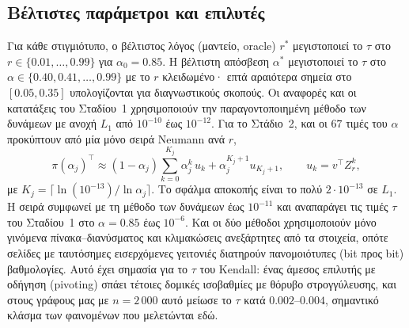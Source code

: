 \documentclass[11pt,a4paper]{article}
\theoremstyle{definition}
\theoremstyle{remark}
\begin{document}
\subsection{Βέλτιστες παράμετροι και επιλυτές}
Για κάθε στιγμιότυπο, ο βέλτιστος λόγος (μαντείο, oracle) $r^*$ μεγιστοποιεί το $\tau$ στο
$r\in\{0.01,\dots,0.99\}$ για $\alpha_0=0.85$. Η βέλτιστη απόσβεση $\alpha^*$ μεγιστοποιεί το $\tau$
στο $\alpha\in\{0.40,0.41,\dots,0.99\}$ με το $r$ κλειδωμένο· επτά αραιότερα σημεία στο $[0.05,0.35]$
υπολογίζονται για διαγνωστικούς σκοπούς. Οι αναφορές και οι κατατάξεις του Σταδίου~1 χρησιμοποιούν την
παραγοντοποιημένη μέθοδο των δυνάμεων με ανοχή $L_1$ από $10^{-10}$ έως $10^{-12}$. Για το Στάδιο~2,
και οι $67$ τιμές του $\alpha$ προκύπτουν από μία μόνο σειρά Neumann ανά $r$,
\[
\pi(\alpha_j)^\top\approx(1-\alpha_j)\sum_{k=0}^{K_j}\alpha_j^k\,u_k+\alpha_j^{K_j+1}u_{K_j+1},
\qquad u_k=v^\top Z_r^k,
\]
με $K_j=\lceil\ln(10^{-13})/\ln\alpha_j\rceil$. Το σφάλμα αποκοπής είναι το πολύ $2\cdot10^{-13}$ σε
$L_1$. Η σειρά συμφωνεί με τη μέθοδο των δυνάμεων έως $10^{-11}$ και αναπαράγει τις τιμές $\tau$ του
Σταδίου~1 στο $\alpha=0.85$ έως $10^{-6}$. Και οι δύο μέθοδοι χρησιμοποιούν μόνο γινόμενα
πίνακα--διανύσματος και κλιμακώσεις ανεξάρτητες από τα στοιχεία, οπότε σελίδες με ταυτόσημες
εισερχόμενες γειτονιές διατηρούν πανομοιότυπες (bit προς bit) βαθμολογίες. Αυτό έχει σημασία για το
$\tau$ του Kendall: ένας άμεσος επιλυτής με οδήγηση (pivoting) σπάει τέτοιες δομικές ισοβαθμίες με
θόρυβο στρογγύλευσης, και στους γράφους μας με $n=2\,000$ αυτό μείωσε το $\tau$ κατά $0.002$--$0.004$,
σημαντικό κλάσμα των φαινομένων που μελετώνται εδώ.
\end{document}
